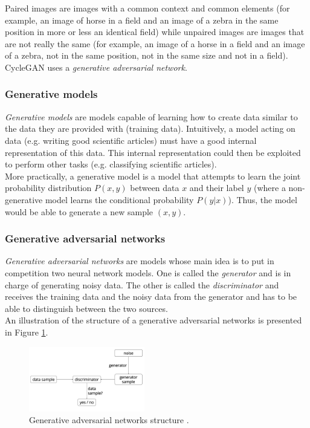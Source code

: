 \documentclass[twocolumn,superscriptaddress,aps]{revtex4-1}
\begin{document}
    Paired images are images with a common context and common elements (for example, an image of horse in a field and an image of a zebra in the same position in more or less an identical field) while unpaired images are images that are not really the same (for example, an image of a horse in a field and an image of a zebra, not in the same position, not in the same size and not in a field).\\
    
    CycleGAN uses a \emph{generative adversarial network}.
    
    \subsubsection{Generative models}
    
    \emph{Generative models} are models capable of learning how to create data similar to the data they are provided with (training data). Intuitively, a model acting on data (e.g. writing good scientific articles) must have a good internal representation of this data. This internal representation could then be exploited to perform other tasks (e.g. classifying scientific articles).\\
    
    More practically, a generative model is a model that attempts to learn the joint probability distribution $P(x,y)$ between data $x$ and their label $y$ (where a non-generative model learns the conditional probability $P(y|x)$). Thus, the model would be able to generate a new sample $(x,y)$.
    
    \subsubsection{Generative adversarial networks}
    
    \emph{Generative adversarial networks} are models whose main idea is to put in competition two neural network models. One is called the \emph{generator} and is in charge of generating noisy data. The other is called the \emph{discriminator} and receives the training data and the noisy data from the generator and has to be able to distinguish between the two sources.\\
    
    An illustration of the structure of a generative adversarial networks is presented in Figure \ref{fig:methods.cyclegan.gan}.
    
    \begin{figure}[ht]
        \centering
        \includegraphics[width=0.45\textwidth]{resources/png/gan.png}
        \caption{Generative adversarial networks structure \cite{blog.aylien.com}.}
        \label{fig:methods.cyclegan.gan}
    \end{figure}
    
\end{document}
